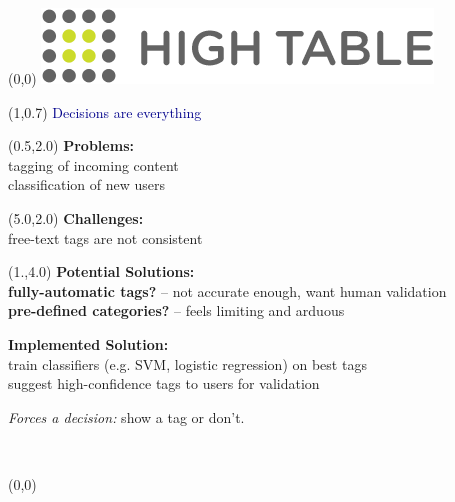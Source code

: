 \documentclass{article}
\renewcommand{\Large}       {\fontsize{20.74}{25}\selectfont}
\renewcommand{\huge}        {\fontsize{26.5}{32}\selectfont}
\newcommand{\VERYHuge}      {\fontsize{61.92}{77}\selectfont}
\begin{document}
\begin{textblock}{3}(0,0)
\includegraphics[width=3\TPHorizModule]{images/ht-logo.png}
\end{textblock}

\begin{textblock}{8}(1,0.7)\Large
\hfill \textcolor{DarkBlue}{\VERYHuge Decisions are everything}
\end{textblock}

\begin{textblock}{5}(0.5,2.0)\Large
\textbf{Problems:}\\
tagging of incoming content\\
classification of new users\\
\vspace{0.5in}
\end{textblock}

\begin{textblock}{5}(5.0,2.0)\Large
\textbf{Challenges:}\\
free-text tags are not consistent\\
\end{textblock}

\begin{textblock}{8}(1.,4.0)
\textbf{Potential Solutions:}\\
\textbf{fully-automatic tags?} -- not accurate enough, want human
validation\\
\textbf{pre-defined categories?} -- feels limiting and arduous
\vspace{0.5in}

\textbf{Implemented Solution:}\\
train classifiers (e.g. SVM, logistic regression) on best tags\\
suggest high-confidence tags to users for validation\\
\vspace{0.1in}

\textit{Forces a decision:} show a tag or don't.
\end{textblock}

\
\clearpage


\pagecolor{white}
\begin{textblock}{5}(0,0)
\centering {\huge Astrophysics}
\end{textblock}
\end{document}
